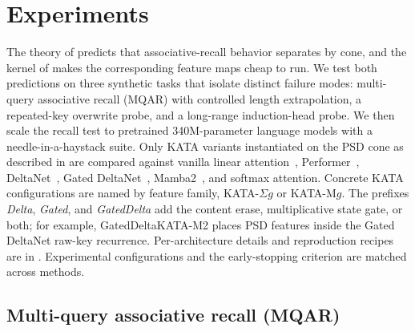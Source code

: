 \documentclass{article}
\newcommand{\1}{\bm{1}}
\theoremstyle{definition}
\begin{document}
\section{Experiments} \label{sec:experiments}
The theory of  predicts that associative-recall behavior separates by cone,
and the kernel of  makes the corresponding feature maps cheap to run. We test
both predictions on three synthetic tasks that isolate distinct failure modes: multi-query
associative recall (MQAR) with controlled length extrapolation, a repeated-key overwrite probe,
and a long-range induction-head probe. We then scale the recall test to pretrained 340M-parameter language models
with a needle-in-a-haystack suite. Only KATA variants instantiated on the PSD cone as described in  are compared against vanilla linear
attention~\citep{katharopoulos20transformers}, Performer~\citep{choromanski21performers},
DeltaNet~\citep{yang24deltanet}, Gated DeltaNet~\citep{yang25gateddeltanet},
Mamba2~\citep{dao24mamba2}, and softmax attention. Concrete KATA configurations are named by feature family, KATA-$\Sigma g$ or KATA-M$g$.
The prefixes \emph{Delta}, \emph{Gated}, and \emph{GatedDelta} add the content erase,
multiplicative state gate, or both; for example, GatedDeltaKATA-M2 places PSD features inside the Gated DeltaNet raw-key
recurrence. Per-architecture details and reproduction recipes
are in . Experimental configurations
and the early-stopping criterion are matched across methods.

\subsection{Multi-query associative recall (MQAR)}
\label{ssec:results-capacity}
\end{document}

